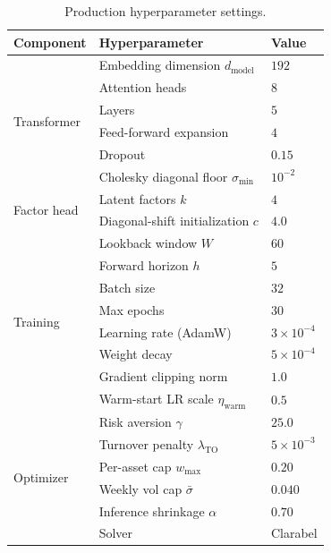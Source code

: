 \documentclass[11pt]{article}
\begin{document}
\begin{table}[h]
\centering
\caption{Production hyperparameter settings.}
\label{tab:hyperparams}
\small
\begin{tabular}{lll}
\toprule
Component & Hyperparameter & Value \\
\midrule
\multirow{6}{*}{Transformer}
& Embedding dimension $d_{\text{model}}$        & $192$ \\
& Attention heads                                 & $8$ \\
& Layers                                          & $5$ \\
& Feed-forward expansion                          & $4$ \\
& Dropout                                         & $0.15$ \\
& Cholesky diagonal floor $\sigma_{\min}$         & $10^{-2}$ \\
\midrule
\multirow{2}{*}{Factor head}
& Latent factors $k$                              & $4$ \\
& Diagonal-shift initialization $c$               & $4.0$ \\
\midrule
\multirow{8}{*}{Training}
& Lookback window $W$                              & $60$ \\
& Forward horizon $h$                              & $5$ \\
& Batch size                                       & $32$ \\
& Max epochs                                       & $30$ \\
& Learning rate (AdamW)                           & $3\times10^{-4}$ \\
& Weight decay                                     & $5\times10^{-4}$ \\
& Gradient clipping norm                           & $1.0$ \\
& Warm-start LR scale $\eta_{\text{warm}}$        & $0.5$ \\
\midrule
\multirow{6}{*}{Optimizer}
& Risk aversion $\gamma$                          & $25.0$ \\
& Turnover penalty $\lambda_{\text{TO}}$          & $5\times10^{-3}$ \\
& Per-asset cap $w_{\max}$                         & $0.20$ \\
& Weekly vol cap $\bar{\sigma}$                    & $0.040$ \\
& Inference shrinkage $\alpha$                    & $0.70$ \\
& Solver                                           & Clarabel \\

\end{tabular}
\end{table}
\end{document}
